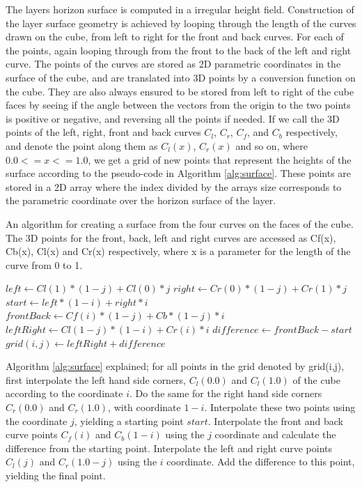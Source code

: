 \documentclass[a4paper,12pt]{report}
\begin{document}
The layers horizon surface is computed in a irregular height field. Construction of the layer surface geometry is achieved by looping through the length of the curves drawn on the cube, from left to right for the front and back curves. For each of the points, again looping through from the front to the back of the left and right curve. The points of the curves are stored as 2D parametric coordinates in the surface of the cube, and are translated into 3D points by a conversion function on the cube. They are also always ensured to be stored from left to right of the cube faces by seeing if the angle between the vectors from the origin to the two points is positive or negative, and reversing all the points if needed. If we call the 3D points of the left, right, front and back curves $C_l$, $C_r$, $C_f$, and $C_b$ respectively, and denote the point along them as $C_l(x)$, $C_r(x)$ and so on, where $0.0 <= x <= 1.0$, we get a grid of new points that represent the heights of the surface according to the 
pseudo-code in Algorithm \ref{alg:surface}. These points are stored in a 2D array where the index divided by the arrays size corresponds to the parametric coordinate over the horizon surface of the layer.

\begin{algorithm}
\caption{An algorithm for creating a surface from the four curves on the faces of the cube. The 3D points for the front,
back, left and right curves are accessed as Cf(x), Cb(x), Cl(x) and Cr(x) respectively, where x is a parameter for the length of the curve from 0 to 1.}
\label{alg:surface}
\begin{algorithmic}
  \State $left \gets Cl(1)*(1-j) + Cl(0)*j$
  \State $right \gets Cr(0)*(1-j) + Cr(1)*j$
  \State $start \gets left*(1-i) + right*i$
  \State $frontBack \gets Cf(i)*(1-j) + Cb*(1-j)*i$
  \State $leftRight \gets Cl(1-j)*(1-i) + Cr(i)*i$
  \State $difference \gets frontBack - start$
  \State $grid(i,j) \gets leftRight + difference$
\EndFor
\end{algorithmic}
\end{algorithm}

Algorithm \ref{alg:surface} explained; for all points in the grid denoted by grid(i,j), first interpolate the left hand side corners, $C_l(0.0)$ and $C_l(1.0)$ of the cube according to the coordinate $i$. Do the same for the right hand side corners $C_r(0.0)$ and $C_r(1.0)$, with coordinate $1-i$. Interpolate these two points using the coordinate $j$, yielding a starting point $start$. Interpolate the front and back curve points $C_f(i)$ and $C_b(1-i)$ using the $j$ coordinate and calculate the difference from the starting point. Interpolate the left and right curve points $C_l(j)$ and $C_r(1.0-j)$ using the $i$ coordinate. Add the difference to this point, yielding the final point. 
\end{document}
